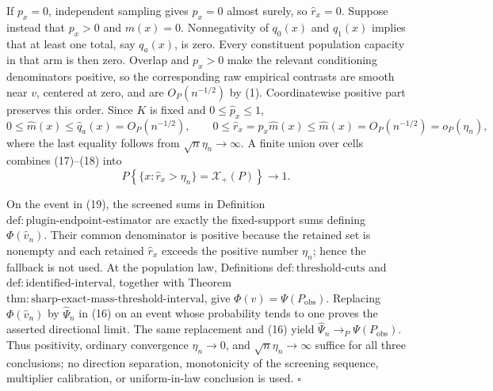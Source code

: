 If \(p_x=0\), independent sampling gives \(\widehat p_x=0\) almost
surely, so \(\widehat r_x=0\).  Suppose instead that \(p_x>0\) and
\(m(x)=0\).  Nonnegativity of \(q_0(x)\) and \(q_1(x)\) implies that at
least one total, say \(q_a(x)\), is zero.  Every constituent population
capacity in that arm is then zero.  Overlap and \(p_x>0\) make the
relevant conditioning denominators positive, so the corresponding raw
empirical contrasts are smooth near \(v\), centered at zero, and are
\(O_P(n^{-1/2})\) by (1).  Coordinatewise positive part preserves this
order.  Since \(K\) is fixed and \(0\le\widehat p_x\le1\),
\[
0\le\widehat m(x)\le\widehat q_a(x)=O_P(n^{-1/2}),
\qquad
0\le\widehat r_x=\widehat p_x\widehat m(x)
\le\widehat m(x)=O_P(n^{-1/2})=o_P(\eta_n),
\tag{18}
\]
where the last equality follows from
\(\sqrt n\eta_n\to\infty\).  A finite union over cells combines
(17)--(18) into
\[
P\!\left\{\{x:\widehat r_x>\eta_n\}=\mathcal X_+(P)\right\}
\longrightarrow1.
\tag{19}
\]

On the event in (19), the screened sums in Definition
\(\mathrm{def{:}plugin\text{-}endpoint\text{-}estimator}\) are exactly
the fixed-support sums defining \(\Phi(\widehat v_n)\).  Their common
denominator is positive because the retained set is nonempty and each
retained \(\widehat r_x\) exceeds the positive number \(\eta_n\); hence
the fallback is not used.  At the population law, Definitions
\(\mathrm{def{:}threshold\text{-}cuts}\) and
\(\mathrm{def{:}identified\text{-}interval}\), together with Theorem
\(\mathrm{thm{:}sharp\text{-}exact\text{-}mass\text{-}threshold\text{-}interval}\),
give \(\Phi(v)=\Psi(P_{\mathrm{obs}})\).  Replacing
\(\Phi(\widehat v_n)\) by \(\widehat\Psi_n\) in (16) on an event whose
probability tends to one proves the asserted directional limit.  The same
replacement and (16) yield
\(\widehat\Psi_n\to_P\Psi(P_{\mathrm{obs}})\).  Thus positivity,
ordinary convergence \(\eta_n\to0\), and
\(\sqrt n\eta_n\to\infty\) suffice for all three conclusions; no
direction separation, monotonicity of the screening sequence,
multiplier calibration, or uniform-in-law conclusion is used.
\(\square\)